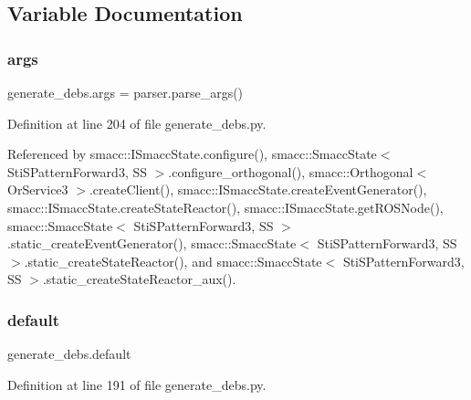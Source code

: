 \subsection{Variable Documentation}
\mbox{\label{namespacegenerate__debs_a75f9143e38df82d83b2e8a6f99cae02c}} 
\subsubsection{\texorpdfstring{args}{args}}
{\footnotesize\ttfamily generate\+\_\+debs.\+args = parser.\+parse\+\_\+args()}



Definition at line 204 of file generate\+\_\+debs.\+py.



Referenced by smacc\+::\+I\+Smacc\+State.\+configure(), smacc\+::\+Smacc\+State$<$ Sti\+S\+Pattern\+Forward3, S\+S $>$.\+configure\+\_\+orthogonal(), smacc\+::\+Orthogonal$<$ Or\+Service3 $>$.\+create\+Client(), smacc\+::\+I\+Smacc\+State.\+create\+Event\+Generator(), smacc\+::\+I\+Smacc\+State.\+create\+State\+Reactor(), smacc\+::\+I\+Smacc\+State.\+get\+R\+O\+S\+Node(), smacc\+::\+Smacc\+State$<$ Sti\+S\+Pattern\+Forward3, S\+S $>$.\+static\+\_\+create\+Event\+Generator(), smacc\+::\+Smacc\+State$<$ Sti\+S\+Pattern\+Forward3, S\+S $>$.\+static\+\_\+create\+State\+Reactor(), and smacc\+::\+Smacc\+State$<$ Sti\+S\+Pattern\+Forward3, S\+S $>$.\+static\+\_\+create\+State\+Reactor\+\_\+aux().

\mbox{\label{namespacegenerate__debs_a3d67a92b7eb3a59c397dc9fdd1c67558}} 
\subsubsection{\texorpdfstring{default}{default}}
{\footnotesize\ttfamily generate\+\_\+debs.\+default}



Definition at line 191 of file generate\+\_\+debs.\+py.

\mbox{\label{namespacegenerate__debs_ab09f4294da5036d5f6881672de9ed9c7}} 
